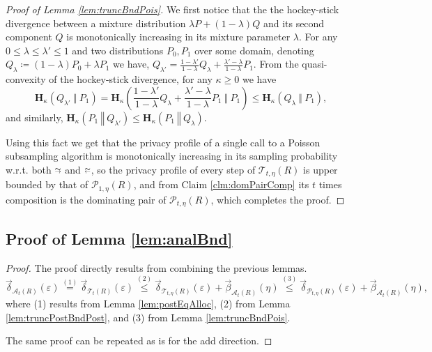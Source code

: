 \documentclass{article}
\newif\ifconferencemode
\newif\ifconferencemode
\theoremstyle{plain}
\theoremstyle{definition}
\newcommand{\eps}{\varepsilon}
\newcommand{\eqExp}[2]{\overset{(#1)}{#2}}
\newcommand{\rand}{R}
\newcommand{\HockeyStick}[1]{\boldsymbol{H}_{#1}}
\newcommand{\HockeyStickDiv}[3]{\HockeyStick{#1}\left(#2 ~\left\Vert~ #3 \right. \right)}
\newcommand{\Pois}[2]{\mathcal{P}_{#1}\left(#2\right)}
\newcommand{\alloc}[2]{\mathcal{A}_{#1}\left(#2\right)}
\newcommand{\post}[2]{\mathcal{T}_{#1}\left(#2\right)}
\newcommand{\rem}[1]{\vec{#1}}
\newcommand{\simAdd}{\mathrel{\substack{\sim\\[-0.8ex] \scalebox{0.6}{$\leftarrow$}}}}
\newcommand{\simRem}{\mathrel{\substack{\sim\\[-0.8ex] \scalebox{0.6}{$\rightarrow$}}}}
\newcommand{\privProfRem}[1]{\rem{\delta}_{#1}}
\begin{document}
\begin{proof} [Proof of Lemma \ref{lem:truncBndPois}]
    We first notice that the the hockey-stick divergence between a mixture distribution $\lambda P + (1-\lambda) Q$ and its second component $Q$ is monotonically increasing in its mixture parameter $\lambda$. For any $0 \le \lambda \le \lambda' \le 1$ and two distributions $P_{0}, P_{1}$ over some domain, denoting $Q_{\lambda} \coloneqq (1-\lambda) P_{0} + \lambda P_{1}$ we have, $Q_{\lambda'} = \frac{1-\lambda'}{1-\lambda} Q_{\lambda} + \frac{\lambda'-\lambda}{1-\lambda} P_{1}$. From the quasi-convexity of the hockey-stick divergence, for any $\kappa \ge 0$ we have 
    \[
        \HockeyStickDiv{\kappa}{Q_{\lambda'}}{P_{1}} = \HockeyStickDiv{\kappa}{\frac{1-\lambda'}{1-\lambda} Q_{\lambda} + \frac{\lambda'-\lambda}{1-\lambda} P_{1}}{P_{1}} \le \HockeyStickDiv{\kappa}{Q_{\lambda}}{P_{1}},
    \]
    and similarly, $\HockeyStickDiv{\kappa}{P_{1}}{Q_{\lambda'}} \le \HockeyStickDiv{\kappa}{P_{1}}{Q_{\lambda}}$.
    
    Using this fact we get that the privacy profile of a single call to a Poisson subsampling algorithm is monotonically increasing in its sampling probability w.r.t. both $\simRem$ and $\simAdd$, so the privacy profile of every step of $\post{t, \eta}{\rand}$ is upper bounded by that of $\Pois{1, \eta}{\rand}$, and from Claim \ref{clm:domPairComp} its $t$ times composition is the dominating pair of $\Pois{t, \eta}{\rand}$, which completes the proof.
\end{proof}

\subsection{Proof of Lemma \ref{lem:analBnd}}
\begin{proof}
    The proof directly results from combining the previous lemmas.
    \[
        \privProfRem{\alloc{t}{\rand}}(\eps) \eqExp{1}{=} \privProfRem{\post{t}{\rand}}(\eps) \eqExp{2}{\le} \privProfRem{\post{t, \eta}{\rand}}(\eps) + \rem{\beta}_{\alloc{t}{\rand}}(\eta) \eqExp{3}{\le} \privProfRem{\Pois{t, \eta}{\rand}}(\eps) + \rem{\beta}_{\alloc{t}{\rand}}(\eta),
    \]
	where (1) results from Lemma \ref{lem:postEqAlloc}, (2) from Lemma \ref{lem:truncPostBndPost}, and (3) from Lemma \ref{lem:truncBndPois}.

    The same proof can be repeated as is for the add direction. 
\end{proof}

\label{apd:analBnd}
\ifconferencemode
\end{document}
